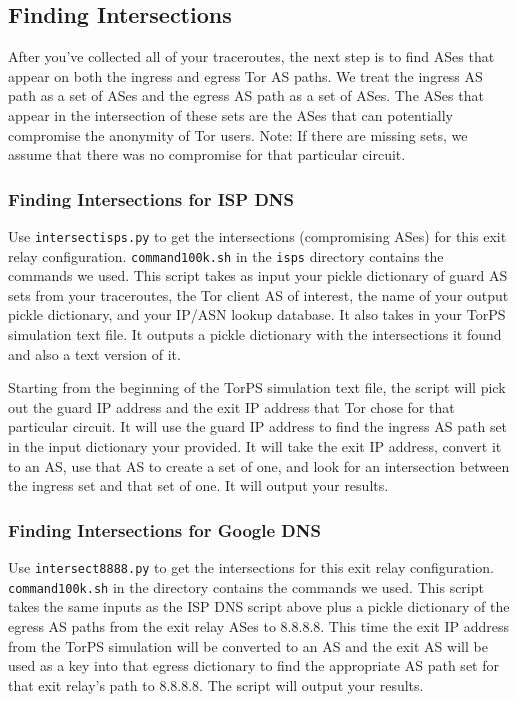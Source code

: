 \documentclass{article}
\begin{document}
\subsection{Finding Intersections}
After you've collected all of your traceroutes, the next step is to find ASes that 
appear on both the ingress and egress Tor AS paths. We treat the ingress AS path 
as a set of ASes and the egress AS path as a set of ASes. The ASes that appear 
in the intersection of these sets are the ASes that can potentially compromise 
the anonymity of Tor users. Note: If there are missing sets, we assume that 
there was no compromise for that particular circuit.

\subsubsection{Finding Intersections for ISP DNS}
Use {\tt intersect\textunderscore isps.py} to get the intersections (compromising ASes) for 
this exit relay configuration. {\tt command\textunderscore 100k.sh} in the {\tt isps} 
directory contains the commands we used. This script takes as input your pickle dictionary of 
guard AS sets from your traceroutes, the Tor client AS of interest, the name of your 
output pickle 
dictionary, and your IP/ASN lookup database. It also takes in your TorPS simulation 
text file. It outputs a pickle dictionary with the intersections it found and also 
a text version of it. 

Starting from the beginning of the TorPS simulation text file, 
the script will pick out the guard IP address and the exit IP address that 
Tor chose for that particular circuit. It will use the guard IP address to find 
the ingress AS path set in the input dictionary your provided. It will take the 
exit IP address, convert it to an AS, use that AS to create a set of one, and 
look for an intersection between the ingress set and that set of one. It will 
output your results.

\subsubsection{Finding Intersections for Google DNS}
Use {\tt intersect\textunderscore 8888.py} to get the intersections for 
this exit relay configuration. {\tt command\textunderscore 100k.sh} in the
 directory contains the commands we used. This script takes the same inputs as the ISP 
DNS script above 
plus a pickle dictionary of the egress AS paths from the exit relay ASes to 8.8.8.8. 
This time the exit IP address from the TorPS simulation will be converted to an 
AS and the exit AS will be used as a key 
into that egress dictionary to find the appropriate AS path set for that exit relay's 
path to 8.8.8.8. The script will output your results.
\end{document}
